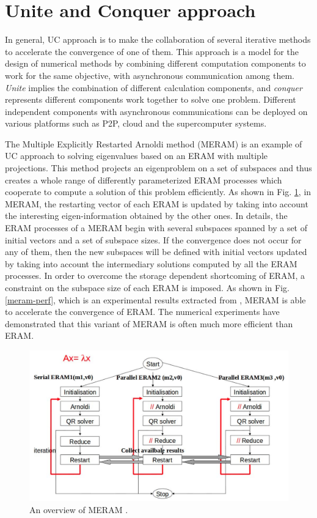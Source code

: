 \vspace{0.6in}

\section{Unite and Conquer approach}\label{Unite and Conquer approach}

In general, UC approach is to make the collaboration of several iterative methods to accelerate the convergence of one of them. This approach is a model for the design of numerical methods by combining different computation components to work for the same objective, with asynchronous communication among them. \textit{Unite} implies the combination of different calculation components, and \textit{conquer} represents different components work together to solve one problem. Different independent components with asynchronous communications can be deployed on various platforms such as P2P, cloud and the supercomputer systems. 

The Multiple Explicitly Restarted Arnoldi method (MERAM) \cite{emad2005multiple} is an example of UC approach to solving eigenvalues based on an ERAM with multiple projections. This method projects an eigenproblem on a set of subspaces and thus creates a whole range of differently parameterized ERAM processes which cooperate to compute a solution of this problem efficiently. As shown in Fig. \ref{meram}, in MERAM, the restarting vector of each ERAM is updated by taking into account the interesting eigen-information obtained by the other ones. In details, the ERAM processes of a MERAM begin with several subspaces spanned by a set of initial vectors and a set of subspace sizes. If the convergence does not occur for any of them, then the new subspaces will be defined with initial vectors updated by taking into account the intermediary solutions computed by all the ERAM processes. In order to overcome the storage dependent shortcoming of ERAM, a constraint on the subspace size of each ERAM is imposed. As shown in Fig. \ref{meram-perf}, which is an experimental results extracted from \cite{emad2005multiple}, MERAM is able to accelerate the convergence of ERAM. The numerical experiments have demonstrated that this variant of MERAM is often much more efficient than ERAM. 

\begin{figure}[htbp]
	\centering
	\includegraphics[width=6.3in]{fig/meram.png}
	\caption{An overview of MERAM \cite{emad2005multiple}.}
	\label{meram}
\end{figure}

